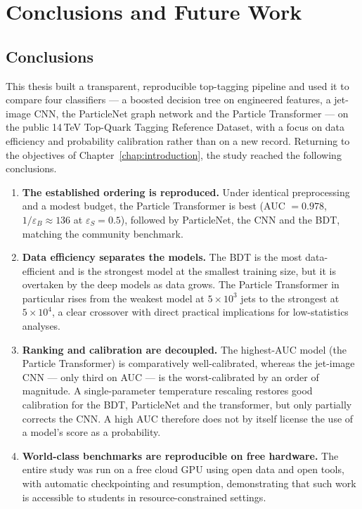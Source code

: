 \chapter{Conclusions and Future Work}
\label{chap:conclusions}

\section{Conclusions}
\label{sec:conclusions}

This thesis built a transparent, reproducible top-tagging pipeline and used
it to compare four classifiers --- a boosted decision tree on engineered
features, a jet-image CNN, the ParticleNet graph network and the Particle
Transformer --- on the public 14\,TeV Top-Quark Tagging Reference Dataset,
with a focus on data efficiency and probability calibration rather than on a
new record. Returning to the objectives of
Chapter~\ref{chap:introduction}, the study reached the following
conclusions.

\begin{enumerate}
    \item \textbf{The established ordering is reproduced.} Under identical
    preprocessing and a modest budget, the Particle Transformer is best
    (AUC $=0.978$, $1/\varepsilon_B\approx136$ at $\varepsilon_S=0.5$),
    followed by ParticleNet, the CNN and the BDT, matching the community
    benchmark.
    \item \textbf{Data efficiency separates the models.} The BDT is the most
    data-efficient and is the strongest model at the smallest training size,
    but it is overtaken by the deep models as data grows. The Particle
    Transformer in particular rises from the weakest model at $5\times10^{3}$
    jets to the strongest at $5\times10^{4}$, a clear crossover with direct
    practical implications for low-statistics analyses.
    \item \textbf{Ranking and calibration are decoupled.} The highest-AUC
    model (the Particle Transformer) is comparatively well-calibrated,
    whereas the jet-image CNN --- only third on AUC --- is the
    worst-calibrated by an order of magnitude. A single-parameter temperature
    rescaling restores good calibration for the BDT, ParticleNet and the
    transformer, but only partially corrects the CNN. A high AUC therefore
    does not by itself license the use of a model's score as a probability.
    \item \textbf{World-class benchmarks are reproducible on free hardware.}
    The entire study was run on a free cloud GPU using open data and open
    tools, with automatic checkpointing and resumption, demonstrating that
    such work is accessible to students in resource-constrained settings.
\end{enumerate}

